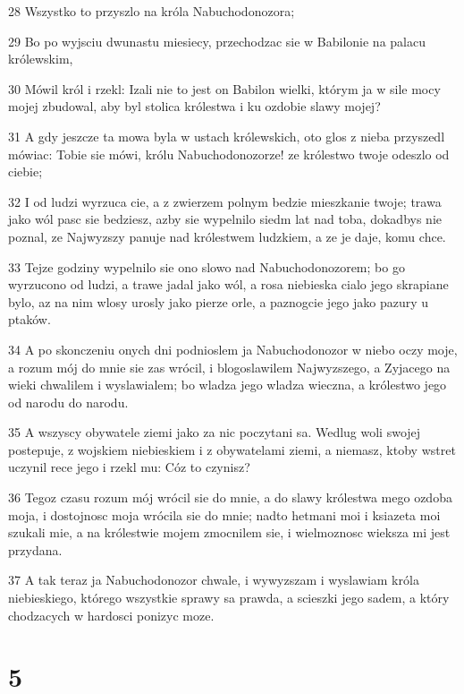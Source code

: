 \par 28 Wszystko to przyszlo na króla Nabuchodonozora;
\par 29 Bo po wyjsciu dwunastu miesiecy, przechodzac sie w Babilonie na palacu królewskim,
\par 30 Mówil król i rzekl: Izali nie to jest on Babilon wielki, którym ja w sile mocy mojej zbudowal, aby byl stolica królestwa i ku ozdobie slawy mojej?
\par 31 A gdy jeszcze ta mowa byla w ustach królewskich, oto glos z nieba przyszedl mówiac: Tobie sie mówi, królu Nabuchodonozorze! ze królestwo twoje odeszlo od ciebie;
\par 32 I od ludzi wyrzuca cie, a z zwierzem polnym bedzie mieszkanie twoje; trawa jako wól pasc sie bedziesz, azby sie wypelnilo siedm lat nad toba, dokadbys nie poznal, ze Najwyzszy panuje nad królestwem ludzkiem, a ze je daje, komu chce.
\par 33 Tejze godziny wypelnilo sie ono slowo nad Nabuchodonozorem; bo go wyrzucono od ludzi, a trawe jadal jako wól, a rosa niebieska cialo jego skrapiane bylo, az na nim wlosy urosly jako pierze orle, a paznogcie jego jako pazury u ptaków.
\par 34 A po skonczeniu onych dni podnioslem ja Nabuchodonozor w niebo oczy moje, a rozum mój do mnie sie zas wrócil, i blogoslawilem Najwyzszego, a Zyjacego na wieki chwalilem i wyslawialem; bo wladza jego wladza wieczna, a królestwo jego od narodu do narodu.
\par 35 A wszyscy obywatele ziemi jako za nic poczytani sa. Wedlug woli swojej postepuje, z wojskiem niebieskiem i z obywatelami ziemi, a niemasz, ktoby wstret uczynil rece jego i rzekl mu: Cóz to czynisz?
\par 36 Tegoz czasu rozum mój wrócil sie do mnie, a do slawy królestwa mego ozdoba moja, i dostojnosc moja wrócila sie do mnie; nadto hetmani moi i ksiazeta moi szukali mie, a na królestwie mojem zmocnilem sie, i wielmoznosc wieksza mi jest przydana.
\par 37 A tak teraz ja Nabuchodonozor chwale, i wywyzszam i wyslawiam króla niebieskiego, którego wszystkie sprawy sa prawda, a scieszki jego sadem, a który chodzacych w hardosci ponizyc moze.

\chapter{5}

